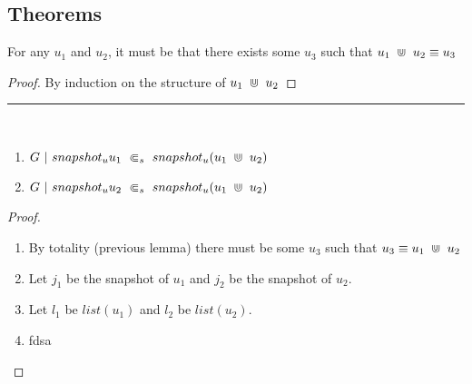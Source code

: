 \begin{mathpar}


\end{mathpar}

\subsection{Theorems}
\begin{lemma}[name=Potential Types Union Totality] For any $u_1$ and $u_2$, it must be that there exists some $u_3$ such that $\ptypsUnion{u_1}{u_2} \equiv u_3$
\begin{proof}
By induction on the structure of $\ptypsUnion{u_1}{u_2}$
\end{proof}
\end{lemma}

\noindent\rule{\textwidth}{1pt}

\begin{lemma}[name=Potential Types Union Correctness]\
\begin{enumerate}
    \item $\ptypSetSubset{G}{snapshot_u u_1}{snapshot_u (\ptypsUnion{u_1}{u_2})}$
    \item $\ptypSetSubset{G}{snapshot_u u_2}{snapshot_u (\ptypsUnion{u_1}{u_2})}$
\end{enumerate}
\begin{proof}
\begin{enumerate}
\item By totality (previous lemma) there must be some $u_3$ such that $u_3 \equiv \ptypsUnion{u_1}{u_2}$
\item Let $j_1$ be the snapshot of $u_1$ and $j_2$ be the snapshot of $u_2$.
\item Let $l_1$ be $list(u_1)$ and $l_2$ be $list(u_2)$.
\item fdsa
\end{enumerate}
\end{proof}
\end{lemma}

